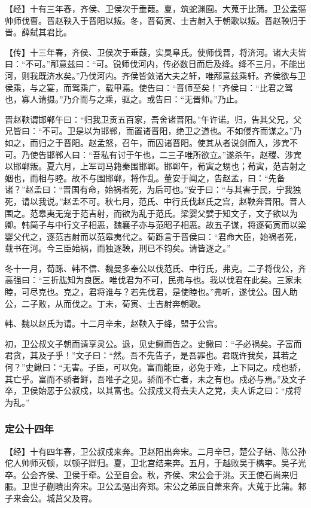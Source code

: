 \documentclass[]{article}
\begin{document}
【经】十有三年春，齐侯、卫侯次于垂葭。夏，筑蛇渊囿。大蒐于比蒲。卫公孟彄帅师伐曹。晋赵鞅入于晋阳以叛。冬，晋荀寅、士吉射入于朝歌以叛。晋赵鞅归于晋。薛弑其君比。

【传】十三年春，齐侯、卫侯次于垂葭，实狊阜氏。使师伐晋，将济河。诸大夫皆曰：``不可。''邴意兹曰：``可。锐师伐河内，传必数日而后及绛。绛不三月，不能出河，则我既济水矣。''乃伐河内。齐侯皆敛诸大夫之轩，唯邴意兹乘轩。齐侯欲与卫侯乘，与之宴，而驾乘广，载甲焉。使告曰：``晋师至矣！''齐侯曰：``比君之驾也，寡人请摄。''乃介而与之乘，驱之。或告曰：``无晋师。''乃止。

晋赵鞅谓邯郸午曰：``归我卫贡五百家，吾舍诸晋阳。''午许诺。归，告其父兄，父兄皆曰：``不可。卫是以为邯郸，而置诸晋阳，绝卫之道也。不如侵齐而谋之。''乃如之，而归之于晋阳。赵孟怒，召午，而囚诸晋阳。使其从者说剑而入，涉宾不可。乃使告邯郸人曰：``吾私有讨于午也，二三子唯所欲立。''遂杀午。赵稷、涉宾以邯郸叛。夏六月，上军司马籍秦围邯郸。邯郸午，荀寅之甥也；荀寅，范吉射之姻也，而相与睦。故不与围邯郸，将作乱。董安于闻之，告赵孟，曰：``先备诸？''赵孟曰：``晋国有命，始祸者死，为后可也。''安于曰：``与其害于民，宁我独死，请以我说。''赵孟不可。秋七月，范氏、中行氏伐赵氏之宫，赵鞅奔晋阳。晋人围之。范皋夷无宠于范吉射，而欲为乱于范氏。梁婴父嬖于知文子，文子欲以为卿。韩简子与中行文子相恶，魏襄子亦与范昭子相恶。故五子谋，将逐荀寅而以梁婴父代之，逐范吉射而以范皋夷代之。荀跞言于晋侯曰：``君命大臣，始祸者死，载书在河。今三臣始祸，而独逐鞅，刑已不钧矣。请皆逐之。''

冬十一月，荀跞、韩不信、魏曼多奉公以伐范氏、中行氏，弗克。二子将伐公，齐高强曰：``三折肱知为良医。唯伐君为不可，民弗与也。我以伐君在此矣。三家未睦，可尽克也。克之，君将谁与？若先伐君，是使睦也。''弗听，遂伐公。国人助公，二子败，从而伐之。丁未，荀寅、士吉射奔朝歌。

韩、魏以赵氏为请。十二月辛未，赵鞅入于绛，盟于公宫。

初，卫公叔文子朝而请享灵公。退，见史鳅而告之。史鳅曰：``子必祸矣。子富而君贪，其及子乎！''文子曰：``然。吾不先告子，是吾罪也。君既许我矣，其若之何？''史鳅曰：``无害。子臣，可以免。富而能臣，必免于难，上下同之。戍也骄，其亡乎。富而不骄者鲜，吾唯子之见。骄而不亡者，未之有也。戍必与焉。''及文子卒，卫侯始恶于公叔戍，以其富也。公叔戍又将去夫人之党，夫人诉之曰：``戍将为乱。''

\hypertarget{header-n3018}{%
\subsubsection{定公十四年}\label{header-n3018}}

【经】十有四年春，卫公叔戍来奔。卫赵阳出奔宋。二月辛巳，楚公子结、陈公孙佗人帅师灭顿，以顿子牂归。夏，卫北宫结来奔。五月，于越败吴于檇李。吴子光卒。公会齐侯、卫侯于牵。公至自会。秋，齐侯、宋公会于洮。天王使石尚来归脤。卫世子蒯瞶出奔宋。卫公孟彄出奔郑。宋公之弟辰自萧来奔。大蒐于比蒲。邾子来会公。城莒父及霄。
\end{document}
